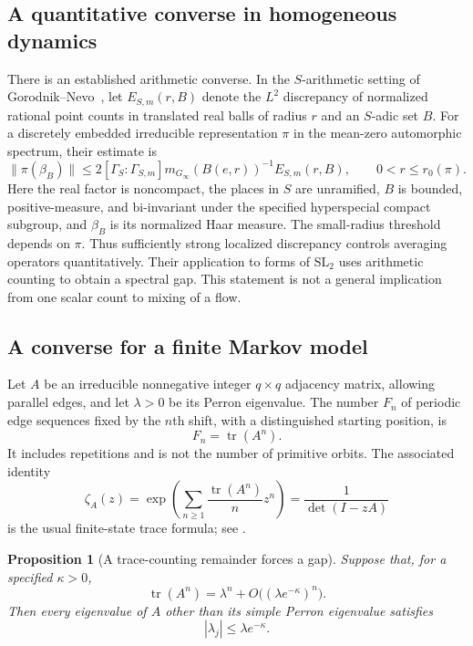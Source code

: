 \documentclass[11pt,a4paper]{article}
\numberwithin{equation}{section}
\newtheorem{proposition}[theorem]{Proposition}
\theoremstyle{definition}
\theoremstyle{remark}
\DeclareMathOperator{\tr}{tr}
\begin{document}
\subsection{A quantitative converse in homogeneous dynamics}

There is an established arithmetic converse. In the $S$-arithmetic
setting of Gorodnik--Nevo~\cite[Theorems 1.4 and 5.2]{GNDiscrepancy},
let $E_{S,m}(r,B)$ denote the $L^2$ discrepancy of normalized rational
point counts in translated real balls of radius $r$ and an
$S$-adic set $B$. For a discretely embedded irreducible representation
$\pi$ in the mean-zero automorphic spectrum, their estimate is
\begin{equation}
 \|\pi(\beta_B)\|
 \leq 2[\Gamma_S:\Gamma_{S,m}]
       m_{G_\infty}(B(e,r))^{-1}E_{S,m}(r,B),
 \qquad 0<r\leq r_0(\pi).
 \label{eq:countmixGN}
\end{equation}
Here the real factor is noncompact, the places in $S$ are unramified,
$B$ is bounded, positive-measure, and bi-invariant under the specified
hyperspecial compact subgroup, and $\beta_B$ is its normalized Haar
measure. The small-radius threshold depends on $\pi$.
Thus sufficiently strong localized discrepancy controls averaging
operators quantitatively. Their application to forms of $\mathrm{SL}_2$
uses arithmetic counting to obtain a spectral gap. This statement is
not a general implication from one scalar count to mixing of a flow.


\subsection{A converse for a finite Markov model}
\label{subsec:countmixfinite}

Let $A$ be an irreducible nonnegative integer $q\times q$ adjacency
matrix, allowing parallel edges, and let $\lambda>0$ be its Perron
eigenvalue. The number $F_n$ of periodic edge sequences fixed by the
$n$th shift, with a distinguished starting position, is
\[
 F_n=\tr(A^n).
\]
It includes repetitions and is not the number of primitive orbits.
The associated identity
\[
 \zeta_A(z)=
 \exp\left(\sum_{n\geq1}\frac{\tr(A^n)}n z^n\right)
 =\frac1{\det(I-zA)}
\]
is the usual finite-state trace formula; see
\cite[Sections 1 and 4]{SharpZeta}.

\begin{proposition}[A trace-counting remainder forces a gap]
\label{prop:countmixfinite}
Suppose that, for a specified $\kappa>0$,
\begin{equation}
 \tr(A^n)=\lambda^n+
          O\bigl((\lambda e^{-\kappa})^n\bigr).
 \label{eq:countmixtrace}
\end{equation}
Then every eigenvalue of $A$ other than its simple Perron eigenvalue
satisfies
\begin{equation}
 |\lambda_j|\leq\lambda e^{-\kappa}.
 \label{eq:countmixgap}
\end{equation}
\end{proposition}
\end{document}
